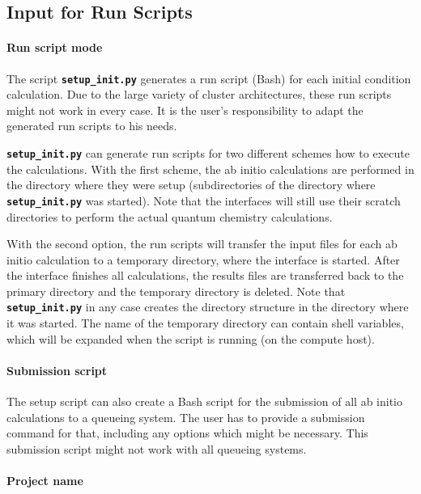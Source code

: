 \documentclass[a4paper,11pt,DIV=15,openany,twoside=false]{scrbook}
\newcommand{\ttt}[1]{\textbf{\texttt{#1}}}
\begin{document}
\subsection{Input for Run Scripts}\label{sec:setup_init.py:run}

\paragraph{Run script mode}

The script \ttt{setup\_init.py} generates a run script (Bash) for each initial condition calculation. Due to the large variety of cluster architectures, these run scripts might not work in every case. It is the user's responsibility to adapt the generated run scripts to his needs.

\ttt{setup\_init.py} can generate run scripts for two different schemes how to execute the calculations. With the first scheme, the ab initio calculations are performed in the directory where they were setup (subdirectories of the directory where \ttt{setup\_init.py} was started). Note that the interfaces will still use their scratch directories to perform the actual quantum chemistry calculations.

With the second option, the run scripts will transfer the input files for each ab initio calculation to a temporary directory, where the interface is started. After the interface finishes all calculations, the results files are transferred back to the primary directory and the temporary directory is deleted. Note that \ttt{setup\_init.py} in any case creates the directory structure in the directory where it was started. The name of the temporary directory can contain shell variables, which will be expanded when the script is running (on the compute host).

\paragraph{Submission script}

The setup script can also create a Bash script for the submission of all ab initio calculations to a queueing system. The user has to provide a submission command for that, including any options which might be necessary. This submission script might not work with all queueing systems.

\paragraph{Project name}
\end{document}
